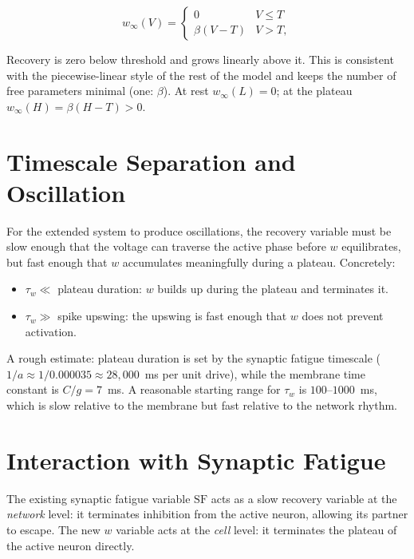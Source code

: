 \documentclass[11pt]{article}
\begin{document}
\begin{equation}
    w_\infty(V) = \begin{cases} 0 & V \leq T \\ \beta(V - T) & V > T, \end{cases}
\end{equation}

Recovery is zero below threshold and grows linearly above it. This is consistent
with the piecewise-linear style of the rest of the model and keeps the number of
free parameters minimal (one: $\beta$). At rest $w_\infty(L) = 0$; at the plateau
$w_\infty(H) = \beta(H - T) > 0$.

\section{Timescale Separation and Oscillation}

For the extended system to produce oscillations, the recovery variable must be slow
enough that the voltage can traverse the active phase before $w$ equilibrates, but
fast enough that $w$ accumulates meaningfully during a plateau. Concretely:

\begin{itemize}
    \item $\tau_w \ll$ plateau duration: $w$ builds up during the plateau and
          terminates it.
    \item $\tau_w \gg$ spike upswing: the upswing is fast enough that $w$ does not
          prevent activation.
\end{itemize}

A rough estimate: plateau duration is set by the synaptic fatigue timescale
($1/a \approx 1/0.000035 \approx 28{,}000$~ms per unit drive), while the
membrane time constant is $C/g = 7$~ms. A reasonable starting range for
$\tau_w$ is $100$--$1000$~ms, which is slow relative to the membrane but fast
relative to the network rhythm.

\section{Interaction with Synaptic Fatigue}

The existing synaptic fatigue variable $\mathrm{SF}$ acts as a slow recovery
variable at the \emph{network} level: it terminates inhibition from the active
neuron, allowing its partner to escape. The new $w$ variable acts at the
\emph{cell} level: it terminates the plateau of the active neuron directly.
\end{document}
